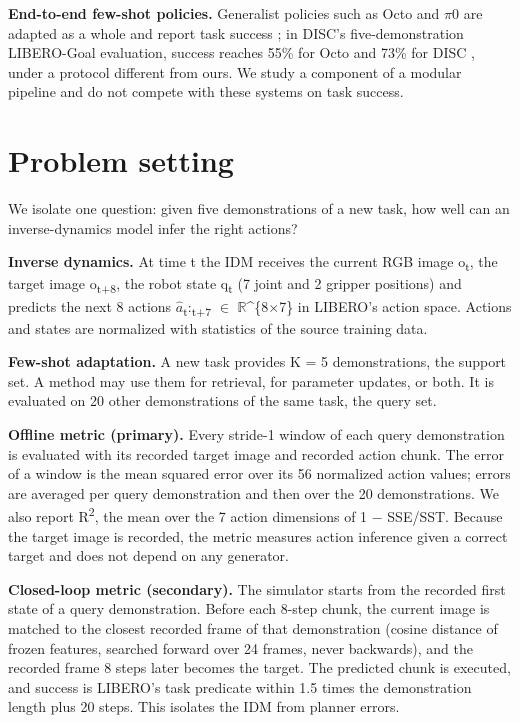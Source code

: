 \documentclass[10pt,twocolumn,letterpaper]{article}
\begin{document}
\textbf{End-to-end few-shot policies.} Generalist policies such as Octo and \ensuremath{\pi}0 are adapted as a whole and report task success \cite{ref39,ref40}; in DISC's five-demonstration LIBERO-Goal evaluation, success reaches 55\% for Octo and 73\% for DISC \cite{ref41}, under a protocol different from ours. We study a component of a modular pipeline and do not compete with these systems on task success.

\section{Problem setting}

We isolate one question: given five demonstrations of a new task, how well can an inverse-dynamics model infer the right actions?

\textbf{Inverse dynamics.} At time t the IDM receives the current RGB image o\textsubscript{t}, the target image o\textsubscript{t+8}, the robot state q\textsubscript{t} (7 joint and 2 gripper positions) and predicts the next 8 actions \ensuremath{\hat{a}}\textsubscript{t}:\textsubscript{t+7} \ensuremath{\in} \ensuremath{\mathbb{R}}\^{}\{8\ensuremath{\times}7\} in LIBERO's action space. Actions and states are normalized with statistics of the source training data.

\textbf{Few-shot adaptation.} A new task provides K = 5 demonstrations, the support set. A method may use them for retrieval, for parameter updates, or both. It is evaluated on 20 other demonstrations of the same task, the query set.

\textbf{Offline metric (primary).} Every stride-1 window of each query demonstration is evaluated with its recorded target image and recorded action chunk. The error of a window is the mean squared error over its 56 normalized action values; errors are averaged per query demonstration and then over the 20 demonstrations. We also report R\textsuperscript{2}, the mean over the 7 action dimensions of 1 \ensuremath{-} SSE/SST. Because the target image is recorded, the metric measures action inference given a correct target and does not depend on any generator.

\textbf{Closed-loop metric (secondary).} The simulator starts from the recorded first state of a query demonstration. Before each 8-step chunk, the current image is matched to the closest recorded frame of that demonstration (cosine distance of frozen features, searched forward over 24 frames, never backwards), and the recorded frame 8 steps later becomes the target. The predicted chunk is executed, and success is LIBERO's task predicate within 1.5 times the demonstration length plus 20 steps. This isolates the IDM from planner errors.
\end{document}
